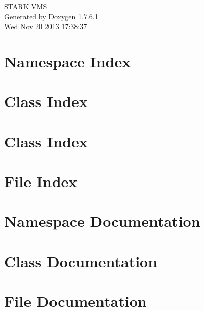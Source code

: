 \documentclass[a4paper]{book}
\begin{document}
\hypersetup{pageanchor=false,citecolor=blue}
\begin{titlepage}
\vspace*{7cm}
\begin{center}
{\Large \-S\-T\-A\-R\-K \-V\-M\-S }\\
\vspace*{1cm}
{\large \-Generated by Doxygen 1.7.6.1}\\
\vspace*{0.5cm}
{\small Wed Nov 20 2013 17:38:37}\\
\end{center}
\end{titlepage}
\clearemptydoublepage
{}
\tableofcontents
\clearemptydoublepage
{}
\hypersetup{pageanchor=true,citecolor=blue}
\chapter{\-Namespace \-Index}

\chapter{\-Class \-Index}

\chapter{\-Class \-Index}

\chapter{\-File \-Index}

\chapter{\-Namespace \-Documentation}


\chapter{\-Class \-Documentation}










\chapter{\-File \-Documentation}










\printindex
\end{document}

